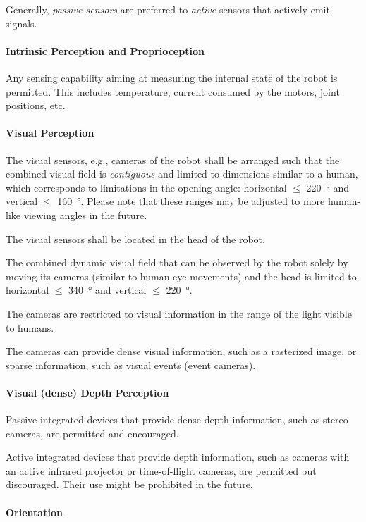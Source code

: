 Generally, \emph{passive sensors} are preferred to \emph{active} sensors that actively emit signals.

\paragraph{Intrinsic Perception and Proprioception}
Any sensing capability aiming at measuring the internal state of the robot is permitted. 
This includes temperature, current consumed by the motors, joint positions, etc.

\paragraph{Visual Perception}
The visual sensors, e.g., cameras of the robot shall be arranged such that the combined visual field is \emph{contiguous} and limited to dimensions similar to a human, which corresponds to limitations in the opening angle: horizontal $\leq$ \SI{220}{\degree} and vertical $\leq$ \SI{160}{\degree}. 
Please note that these ranges may be adjusted to more human-like viewing angles in the future.

The visual sensors shall be located in the head of the robot.

The combined dynamic visual field that can be observed by the robot solely by moving its cameras (similar to human eye movements) and the head is limited to horizontal $\leq$ \SI{340}{\degree} and vertical $\leq$ \SI{220}{\degree}.

The cameras are restricted to visual information in the range of the light visible to humans.

The cameras can provide dense visual information, such as a rasterized image, or sparse information, such as visual events (event cameras).


\paragraph{Visual (dense) Depth Perception}

Passive integrated devices that provide dense depth information, such as stereo cameras, are permitted and encouraged.

Active integrated devices that provide depth information, such as cameras with an active infrared projector or time-of-flight cameras, are permitted but discouraged.
Their use might be prohibited in the future.


\paragraph{Orientation}

